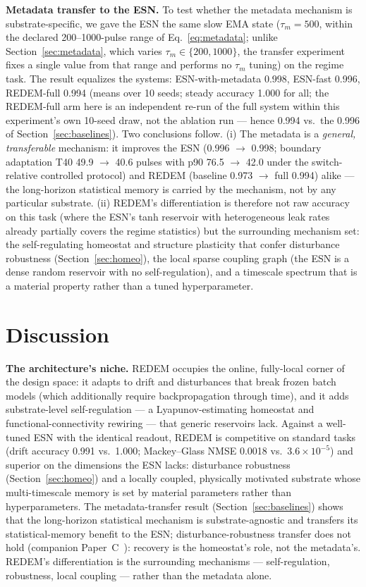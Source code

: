 \documentclass[11pt]{article}
\begin{document}
\textbf{Metadata transfer to the ESN.} To test whether the metadata mechanism
is substrate-specific, we gave the ESN the same slow EMA
state ($\tau_m = 500$, within the declared 200--1000-pulse range of
Eq.~\ref{eq:metadata}; unlike Section~\ref{sec:metadata}, which varies
$\tau_m\in\{200,1000\}$, the transfer experiment fixes a single value from
that range and performs no $\tau_m$ tuning) on the regime task. The result equalizes the systems:
ESN-with-metadata 0.998, ESN-fast 0.996, REDEM-full 0.994 (means over 10 seeds;
steady accuracy 1.000 for all; the REDEM-full arm here is an independent
re-run of the full system within this experiment's own 10-seed draw, not the
ablation run --- hence 0.994 vs.\ the 0.996 of
Section~\ref{sec:baselines}). Two conclusions follow. (i) The metadata is a
\emph{general, transferable} mechanism: it improves the ESN (0.996
$\rightarrow$ 0.998; boundary adaptation T40 49.9 $\rightarrow$ 40.6 pulses
with p90 76.5 $\rightarrow$ 42.0 under the switch-relative controlled
protocol) and REDEM (baseline
0.973 $\rightarrow$ full 0.994) alike --- the long-horizon statistical memory is
carried by the mechanism, not by any particular substrate. (ii) REDEM's
differentiation is therefore not raw accuracy on this task (where the ESN's
tanh reservoir with heterogeneous leak rates already partially covers the
regime statistics) but the surrounding mechanism set: the self-regulating
homeostat and structure plasticity that confer disturbance robustness
(Section~\ref{sec:homeo}), the local sparse coupling graph (the ESN is a dense
random reservoir with no self-regulation), and a timescale spectrum that is a
material property rather than a tuned hyperparameter.

\section{Discussion}
\label{sec:discussion}

\textbf{The architecture's niche.} REDEM occupies the online, fully-local
corner of the design space: it adapts to drift and disturbances that break
frozen batch models (which additionally require backpropagation through time),
and it adds substrate-level self-regulation --- a Lyapunov-estimating homeostat
and functional-connectivity rewiring --- that generic reservoirs lack. Against
a well-tuned ESN with the identical readout, REDEM is competitive on standard
tasks (drift accuracy 0.991 vs.\ 1.000; Mackey--Glass NMSE 0.0018 vs.\
$3.6\times10^{-5}$)
and superior on the dimensions the ESN lacks: disturbance robustness
(Section~\ref{sec:homeo}) and a locally coupled, physically motivated substrate
whose multi-timescale memory is set by material parameters rather than
hyperparameters. The metadata-transfer result (Section~\ref{sec:baselines})
shows that the long-horizon statistical mechanism is substrate-agnostic and
transfers its statistical-memory benefit to the ESN; disturbance-robustness
transfer does not hold (companion Paper~C~\cite{companionC}): recovery is the homeostat's
role, not the metadata's. REDEM's differentiation is the surrounding
mechanisms --- self-regulation, robustness, local coupling --- rather than
the metadata alone.
\end{document}
